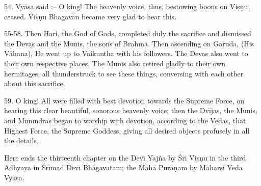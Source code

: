 54. Vy\=asa said :-- O king! The heavenly voice, thus, bestowing boons on Vi\d{s}\d{n}u, ceased. Vi\d{s}\d{n}u Bhagav\=an became very glad to hear this.

55-58. Then Hari, the God of Gods, completed duly the sacrifice and dismissed the Devas and the Munis, the sons of Brahm\=a. Then ascending on Garuda, (His V\=ahana), He went up to Vaikuntha with his followers. The Devas also went to their own respective places. The Munis also retired gladly to their own hermitages, all thunderstruck to see these things, conversing with each other about this sacrifice.

59. O king! All were filled with best devotion towards the Supreme Force, on hearing this clear beautiful, sonorous heavenly voice; then the Dv\={\i}jas, the Munis, and Mun\={\i}ndras began to worship with devotion, according to the Vedas, that Highest Force, the Supreme Goddess, giving all desired objects profusely in all the details.

Here ends the thirteenth chapter on the Dev\={\i} Yaj\~na by \'Sr\={\i} Vi\d{s}\d{n}u in the third Adhyaya in \'Sr\={\i}mad Dev\={\i} Bh\=agavatam; the Mah\=a Pur\=a\d{n}am by Mahar\d{s}i Veda Vy\=asa.



